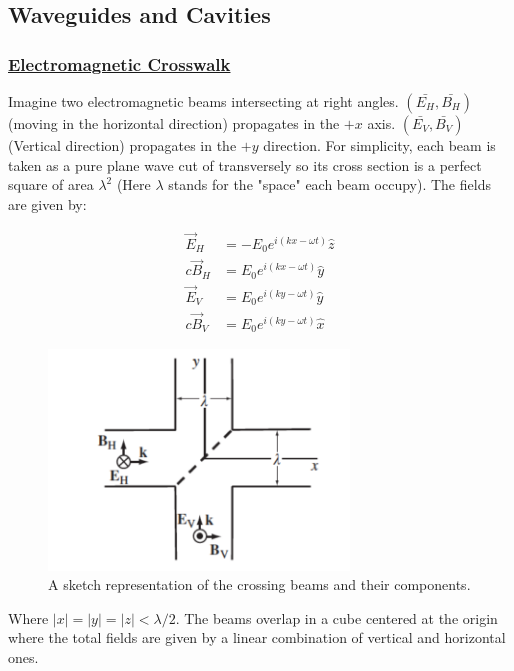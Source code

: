 \subsection{Waveguides and Cavities}

 \subsubsection{\hyperref[Electromagnetic Crosswalk]{Electromagnetic Crosswalk}}
 
Imagine two electromagnetic beams intersecting at right angles. $(\bar{E_{H}},\bar{B_{H}})$ (moving in the horizontal direction) propagates in the $+x$ axis. $(\bar{E_{V}},\bar{B_{V}})$ (Vertical direction) propagates in the $+y$ direction. For simplicity, each beam is taken as a pure plane wave cut of transversely so its cross section is a perfect square of area $\lambda^{2}$ (Here $\lambda$ stands for the "space" each beam occupy). The fields are given by:
	
\begin{subequations}
\begin{align}
\vec{E}_{H} &= -E_{0} e^{i(kx - \omega t)} \hat{z}\\
c \vec{B}_{H} &= E_{0} e^{i(kx - \omega t)} \hat{y}\\
\vec{E}_{V} &= E_{0} e^{i(ky - \omega t)} \hat{y}\\
c \vec{B}_{V} &= E_{0} e^{i(ky - \omega t)} \hat{x}
\end{align}
\end{subequations}

\begin{figure}[h]
	\includegraphics[width=8cm]{figures/crossbeams.png}
	\centering
	\caption{A sketch representation of the crossing beams and their components.}
\end{figure}

Where $\left|x\right|=\left|y\right|=\left|z\right|< \lambda/2$. The beams overlap in a cube centered at the origin where the total fields are given by a linear combination of vertical and horizontal ones.

